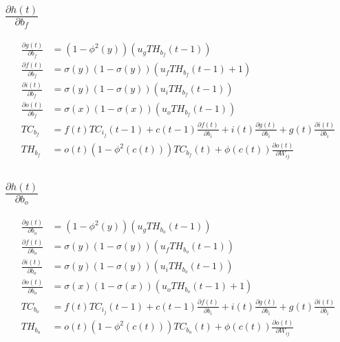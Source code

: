 \documentclass{article}
\begin{document}
\subsection{$\frac{\partial h(t)}{\partial b_{f}}$}

\begin{equation}
\begin{aligned}
\frac{\partial g(t)}{\partial b_{f}} &=  
(1-\phi^2(y))(u_g TH_{b_{f}}(t-1))  \\
\frac{\partial f(t)}{\partial b_{f}} &=  \sigma(y)(1-\sigma(y))( u_f TH_{b_{f}}(t-1) + 1 ) \\
\frac{\partial i(t)}{\partial b_{f}}  &= \sigma(y)(1-\sigma(y))( u_i TH_{b_{f}}(t-1))  \\
\frac{\partial o(t)}{\partial b_{f}} &=  \sigma(x)(1-\sigma(x))( u_o TH_{b_{f}}(t-1))  \\
TC_{b_{f}}&= f(t) TC_{i_j}(t-1) + c(t-1)\frac{\partial f(t)}{ \partial b_i} + i(t)\frac{\partial g(t) }{\partial b_i}  + g(t)\frac{\partial i(t) }{\partial b_i}  \\
TH_{b_{f}}&= o(t) (1-\phi^{2}(c(t))) TC_{b_{f}}(t)  + \phi(c(t)) \frac{\partial o(t)}{\partial W_{ij}}  
\end{aligned}
\end{equation}

\subsection{$\frac{\partial h(t)}{\partial b_{o}}$}

\begin{equation}
\begin{aligned}
\frac{\partial g(t)}{\partial b_{o}} &=  
(1-\phi^2(y))(u_g TH_{b_{o}}(t-1))  \\
\frac{\partial f(t)}{\partial b_{o}} &=  \sigma(y)(1-\sigma(y))( u_f TH_{b_{o}}(t-1)) \\
\frac{\partial i(t)}{\partial b_{o}}  &= \sigma(y)(1-\sigma(y))( u_i TH_{b_{o}}(t-1))  \\
\frac{\partial o(t)}{\partial b_{o}} &=  \sigma(x)(1-\sigma(x))( u_o TH_{b_{o}}(t-1) + 1 )  \\
TC_{b_{o}}&= f(t) TC_{i_j}(t-1) + c(t-1)\frac{\partial f(t)}{ \partial b_i} + i(t)\frac{\partial g(t) }{\partial b_i}  + g(t)\frac{\partial i(t) }{\partial b_i}  \\
TH_{b_{o}}&= o(t) (1-\phi^{2}(c(t))) TC_{b_{o}}(t)  + \phi(c(t)) \frac{\partial o(t)}{\partial W_{ij}}  
\end{aligned}
\end{equation}

\end{document}
